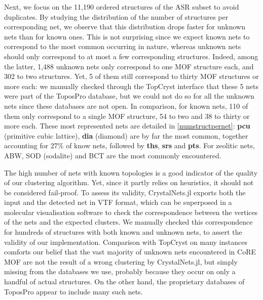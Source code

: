 \documentclass[main.tex]{subfiles}
\begin{document}
Next, we focus on the 11,190 ordered structures of the ASR subset to avoid duplicates.
By studying the distribution of the number of structures per corresponding net, we observe that this distribution drops faster for unknown nets than for known ones. This is not surprising since we expect known nets to correspond to the most common occurring in nature, whereas unknown nets should only correspond to at most a few corresponding structures. Indeed, among the latter, 1,488 unknown nets only correspond to one MOF structure each, and 302 to two structures. Yet, 5 of them still correspond to thirty MOF structures or more each: we manually checked through the TopCryst interface \autocite{TopCryst} that these 5 nets were part of the ToposPro database, but we could not do so for all the unknown nets since these databases are not open. In comparison, for known nets, 110 of them only correspond to a single MOF structure, 54 to two and 38 to thirty or more each. These most represented nets are detailed in \autoref{numstructpernet}: \textbf{pcu} (primitive cubic lattice), \textbf{dia} (diamond) are by far the most common, together accounting for {27\%} of know nets, followed by \textbf{ths}, \textbf{srs} and \textbf{pts}. For zeolitic nets, ABW, SOD (sodalite) and BCT are the most commonly encountered.

The high number of nets with known topologies is a good indicator of the quality of our clustering algorithm. Yet, since it partly relies on heuristics, it should not be considered fail-proof. To assess its validity, CrystalNets.jl exports both the input and the detected net in VTF format, which can be superposed in a molecular visualisation software to check the correspondence between the vertices of the nets and the expected clusters. We manually checked this correspondence for hundreds of structures with both known and unknown nets, to assert the validity of our implementation. Comparison with TopCryst on many instances comforts our belief that the vast majority of unknown nets encountered in CoRE MOF are not the result of a wrong clustering by CrystalNets.jl, but simply missing from the databases we use, probably because they occur on only a handful of actual structures. On the other hand, the proprietary databases of ToposPro appear to include many such nets.
\end{document}
